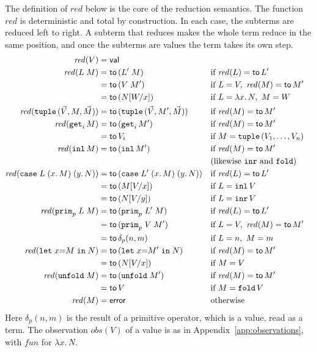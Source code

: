 The definition of $\mathit{red}$ below is the core of the reduction semantics.
The function $\mathit{red}$ is deterministic and total by construction. In each
case, the subterms are reduced left to right. A subterm that reduces makes the
whole term reduce in the same position, and once the subterms are values the
term takes its own step.
\begin{align*}
  \mathit{red}(V) &= \mathsf{val} \\
  \mathit{red}(L\;M) &= \mathsf{to}\,(L'\;M) &&\text{if } \mathit{red}(L) = \mathsf{to}\,L' \\
 &= \mathsf{to}\,(V\;M') &&\text{if } L = V,\ \mathit{red}(M) = \mathsf{to}\,M' \\
 &= \mathsf{to}\,(N[W/x]) &&\text{if } L = \lambda x.\,N,\ M = W \\
  \mathit{red}(\kw{tuple}\,(\vec{V}, M, \vec{M})) &= \mathsf{to}\,(\kw{tuple}\,(\vec{V}, M', \vec{M})) &&\text{if } \mathit{red}(M) = \mathsf{to}\,M' \\
  \mathit{red}(\kw{get}_i\,M) &= \mathsf{to}\,(\kw{get}_i\,M') &&\text{if } \mathit{red}(M) = \mathsf{to}\,M' \\
 &= \mathsf{to}\,V_i &&\text{if } M = \kw{tuple}\,(V_1, \ldots, V_n) \\
  \mathit{red}(\kw{inl}\,M) &= \mathsf{to}\,(\kw{inl}\,M') &&\text{if } \mathit{red}(M) = \mathsf{to}\,M' \\
 & &&\text{(likewise $\kw{inr}$ and $\kw{fold}$)} \\
  \mathit{red}(\kw{case}\;L\;(x.\,M)\;(y.\,N)) &= \mathsf{to}\,(\kw{case}\;L'\;(x.\,M)\;(y.\,N)) &&\text{if } \mathit{red}(L) = \mathsf{to}\,L' \\
 &= \mathsf{to}\,(M[V/x]) &&\text{if } L = \kw{inl}\,V \\
 &= \mathsf{to}\,(N[V/y]) &&\text{if } L = \kw{inr}\,V \\
  \mathit{red}(\kw{prim}_p\;L\;M) &= \mathsf{to}\,(\kw{prim}_p\;L'\;M) &&\text{if } \mathit{red}(L) = \mathsf{to}\,L' \\
 &= \mathsf{to}\,(\kw{prim}_p\;V\;M') &&\text{if } L = V,\ \mathit{red}(M) = \mathsf{to}\,M' \\
 &= \mathsf{to}\,\delta_p(n, m) &&\text{if } L = n,\ M = m \\
  \mathit{red}(\kw{let}\;x{=}M\;\kw{in}\;N) &= \mathsf{to}\,(\kw{let}\;x{=}M'\;\kw{in}\;N) &&\text{if } \mathit{red}(M) = \mathsf{to}\,M' \\
 &= \mathsf{to}\,(N[V/x]) &&\text{if } M = V \\
  \mathit{red}(\kw{unfold}\;M) &= \mathsf{to}\,(\kw{unfold}\;M') &&\text{if } \mathit{red}(M) = \mathsf{to}\,M' \\
 &= \mathsf{to}\,V &&\text{if } M = \kw{fold}\,V \\
  \mathit{red}(M) &= \mathsf{error} &&\text{otherwise}
\end{align*}
Here $\delta_p(n, m)$ is the result of a primitive operator, which is a value,
read as a term. The observation $\mathit{obs}(V)$ of a value is as in
Appendix~\ref{app:observations}, with $\mathit{fun}$ for $\lambda x.\,N$.

